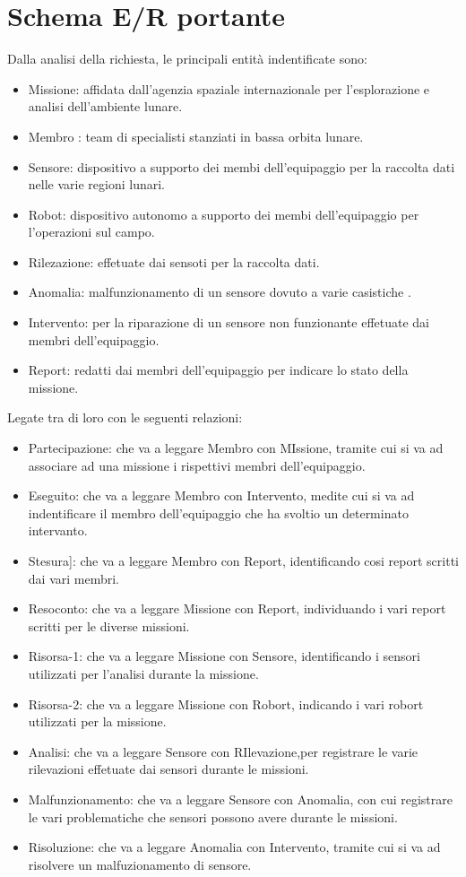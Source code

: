 \section{Schema E/R portante}
Dalla analisi della richiesta, le principali entità indentificate sono:
\begin{itemize}
\item Missione: affidata dall'agenzia spaziale internazionale per l'esplorazione e analisi dell'ambiente lunare.
\item Membro : team di specialisti stanziati in bassa orbita lunare.
\item Sensore: dispositivo a supporto dei membi dell'equipaggio per la raccolta dati nelle varie regioni lunari.
\item Robot: dispositivo autonomo a supporto dei membi dell'equipaggio per l'operazioni sul campo.
\item Rilezazione: effetuate dai sensoti per la raccolta dati.
\item Anomalia: malfunzionamento di un sensore dovuto a varie casistiche .
\item Intervento: per la riparazione di un sensore non funzionante effetuate dai membri dell'equipaggio.
\item Report: redatti dai membri dell'equipaggio per indicare lo stato della missione.
\end{itemize}
Legate tra di loro con le seguenti relazioni:
\begin{itemize}
\item Partecipazione: che va a leggare Membro con MIssione, tramite cui si va ad associare ad una missione i rispettivi membri dell'equipaggio.
\item Eseguito: che va a leggare Membro con Intervento, medite cui si va ad indentificare il membro dell'equipaggio che ha svoltio un determinato intervanto.
\item Stesura]:  che va a leggare Membro con Report, identificando cosi report scritti dai vari membri.
\item Resoconto: che va a leggare Missione con Report, individuando i vari report scritti per le diverse missioni.
\item Risorsa-1:  che va a leggare Missione con Sensore, identificando i sensori utilizzati per l'analisi durante la missione.
\item Risorsa-2:  che va a leggare Missione con Robort, indicando i vari robort utilizzati per la missione.
\item Analisi: che va a leggare Sensore con RIlevazione,per registrare le varie rilevazioni effetuate dai sensori durante le missioni.
\item Malfunzionamento: che va a leggare Sensore con Anomalia, con cui registrare le vari problematiche che sensori possono avere durante le missioni.
\item Risoluzione: che va a leggare Anomalia con Intervento, tramite cui si va ad risolvere un malfuzionamento di sensore.
\end{itemize}